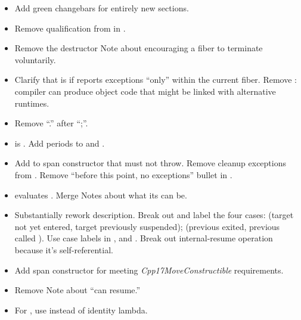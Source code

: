 \begin{itemize}
    \item Add green changebars for entirely new sections.
    \item Remove  qualification from  in \effects.
    \item Remove the destructor Note about encouraging a fiber to terminate
          voluntarily.
    \item Clarify that  is \true if
          \curex reports exceptions ``only'' within the current fiber.
          Remove : compiler can produce object code that might
          be linked with alternative runtimes.
    \item Remove ``.'' after ``;''.
    \item \resumewith\xspace\mandates\xspace{} is \true.
          Add periods to \mandates and \precond.
    \item Add \precond to span constructor that  must not throw.
          Remove cleanup exceptions from \resumewith \xspace \except. Remove
          ``before this point, no exceptions'' bullet in \effects.\
    \item \resumewith evaluates . Merge Notes about what
          its \cpp{returned} can be.
    \item Substantially rework \resumewith description. Break out and label
          the four cases: (target not yet entered, target previously
          suspended); (previous exited, previous called \resumewith). Use case
          labels in \effects, \returns and \except. Break out internal-resume
          operation because it's self-referential.
    \item Add span constructor \precond for 
          meeting \emph{Cpp17MoveConstructible} requirements.
    \item Remove \canresume Note about ``can resume.''
    \item For \resume, use  instead of identity lambda.
\end{itemize}


